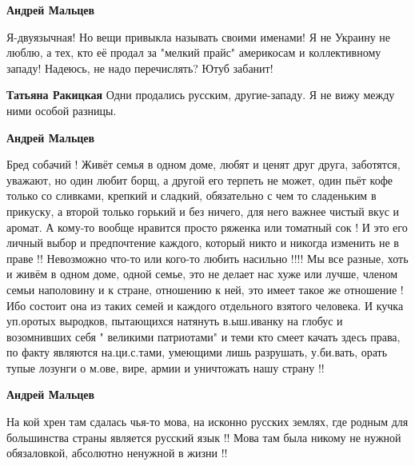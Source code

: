 \begin{itemize}
\begin{itemize}
\textbf{Андрей Мальцев} 

Я-двуязычная! Но вещи привыкла называть своими именами! Я
не Украину не люблю, а тех, кто её продал за "мелкий прайс" америкосам и
коллективному западу! Надеюсь, не надо перечислять? Ютуб забанит!


 
\textbf{Татьяна Ракицкая} Одни продались русским, другие-западу. Я не вижу между ними особой разницы.

 
\textbf{Андрей Мальцев} 

Бред собачий ! Живёт семья в одном доме, любят и ценят друг друга, заботятся,
уважают, но один любит борщ, а другой его терпеть не может, один пьёт кофе
только со сливками, крепкий и сладкий, обязательно с чем то сладеньким в
прикуску, а второй только горький и без ничего, для него важнее чистый вкус и
аромат. А кому-то вообще нравится просто ряженка или томатный сок ! И это его
личный выбор и предпочтение каждого, который никто и никогда изменить не в
праве !! Невозможно что-то или кого-то любить насильно !!!! Мы все разные, хоть
и живём в одном доме, одной семье, это не делает нас хуже или лучше, членом
семьи наполовину и к стране, отношению к ней, это имеет такое же отношение !
Ибо состоит она из таких семей и каждого отдельного взятого человека. И кучка
уп.оротых выродков, пытающихся натянуть в.ыш.иванку на глобус и возомнивших
себя " великими патриотами" и теми кто смеет качать здесь права, по факту
являются на.ци.с.тами, умеющими лишь разрушать, у.би.вать, орать тупые лозунги
о м.ове, вире, армии и уничтожать нашу страну !!


 
\textbf{Андрей Мальцев} 

На кой хрен там сдалась чья-то мова, на исконно русских землях, где родным для
большинства страны является русский язык !! Мова там была никому не нужной
обязаловкой, абсолютно ненужной в жизни !!


\end{itemize}
\end{itemize}
